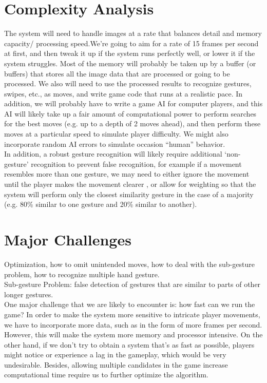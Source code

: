 \documentclass{article}
\begin{document}
	\section{Complexity Analysis}
	The system will need to handle images at a rate that balances detail and memory capacity/ processing speed.We’re going to aim for a rate of 15 frames per second at first, and then tweak it up if the system runs perfectly well, or lower it if the system struggles. Most of the memory will probably be taken up by a buffer (or buffers) that stores all the image data that are processed or going to be processed. We also will need to use the processed results to recognize gestures, swipes, etc., as moves, and write game code that runs at a realistic pace. In addition, we will probably have to write a game AI for computer players, and this AI will likely take up a fair amount of computational power to perform searches for the best moves (e.g. up to a depth of 2 moves ahead), and then perform these moves at a particular speed to simulate player difficulty. We might also incorporate random AI errors to simulate occasion “human” behavior.\\
	
	In addition, a robust gesture recognition will likely require additional ‘non-gesture’ recognition to prevent false recognition, for example if a movement resembles more than one gesture, we may need to either ignore the movement until the player makes the movement clearer , or allow for weighting so that the system will perform only the closest similarity gesture in the case of a majority (e.g. 80\% similar to one gesture and 20\% similar to another).\\
	
	\section{Major Challenges}
	Optimization, how to omit unintended moves, how to deal with the sub-gesture problem, how to recognize multiple hand gesture.\\
	
	Sub-gesture Problem: false detection of gestures that are similar to parts of other longer gestures.\\
	
	One major challenge that we are likely to encounter is: how fast can we run the game? In order to make the system more sensitive to intricate player movements, we have to incorporate more data, such as in the form of more frames per second. However, this will make the system more memory and processor intensive. On the other hand, if we don’t try to obtain a system that’s as fast as possible, players might notice or experience a lag in the gameplay, which would be very undesirable. Besides, allowing multiple candidates in the game increase computational time require us to further optimize the algorithm.\\ 
	
\end{document}
